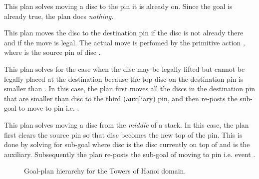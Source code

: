 {} This plan solves moving a disc to the pin it is
already on. Since the goal is already true, the plan does \emph{nothing}.

{} This plan moves the disc  to the destination
pin  if the disc is not already there and if the move is legal. The actual move
is perfomed by the primitive action , where  is the source pin
of disc .

{} This plan solves for the case when the disc  
may be legally lifted but cannot be legally placed at the destination because the 
top disc on the destination pin is smaller than .
In this case, the plan first moves all the discs in the destination pin that are
smaller than disc  to the third (auxiliary) pin, and then
re-posts the sub-goal to move  to pin  i.e. . 

{} This plan solves moving a disc from the
\emph{middle} of a stack.
In this case, the plan first clears the source pin so
that disc  becomes the new top of the pin. This is done by
solving for sub-goal  where disc  is the
disc currently on top of  and  is the
auxiliary.
Subsequently the plan re-posts the
sub-goal of moving  to pin  i.e. event .


\begin{figure}[t]
\begin{center}
\resizebox{.9\textwidth}{!}{}
\end{center}
\vskip -0.5cm
\caption{Goal-plan hierarchy for the Towers of Hanoi domain.}
\label{fig:hanoi_goalplan}
\end{figure}


